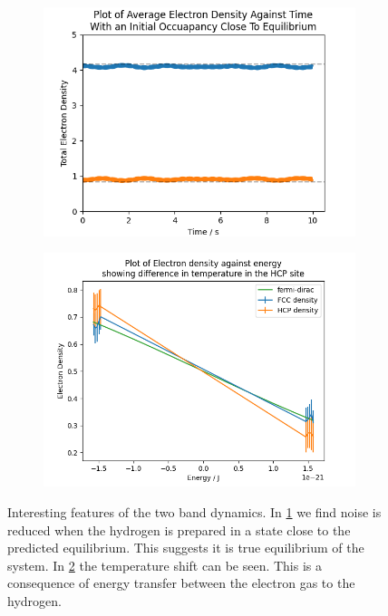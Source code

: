 \begin{figure}[htbp]
    \centering
    \begin{subfigure}{0.45\linewidth}
        \includegraphics[width=0.9\linewidth]{Figures/Simulation/Two Small Bands Probability Clsoe To Equilibrium.png}
        \label{fig:two band close to equilibrium}
    \end{subfigure}
    \begin{subfigure}{0.45\linewidth}
        \includegraphics[width=0.9\linewidth]{Figures/Simulation/two band electron distribution.png}
        \label{fig:two band temperature shift}
    \end{subfigure}
    \caption{
        Interesting features of the two
        band dynamics.
        In \cref{fig:two band close to equilibrium}
        we find noise is reduced when the
        hydrogen is prepared in a state
        close to the predicted equilibrium.
        This suggests it is
        true equilibrium of the
        system.
        In \cref{fig:two band temperature shift}
        the temperature shift can be seen.
        This is a consequence of energy transfer
        between the electron gas to the
        hydrogen.
    }\label{fig:final notes two band}
\end{figure}